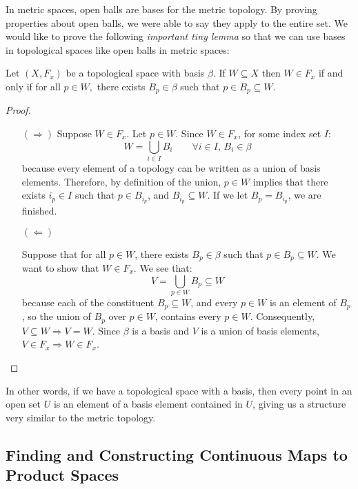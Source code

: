 In metric spaces, open balls are bases for the metric topology. By proving properties about open balls, we were able to say they apply to the entire set. We would like to prove the following \emph{important tiny lemma} so that we can use bases in topological spaces like open balls in metric spaces: 
\begin{lemma}
	Let $(X,F_x)$ be a topological space with basis $\beta$. If $W\subseteq X$ then $W\in F_x$ if and only if for all $p\in W,$ there exists $B_p\in\beta$ such that $p\in B_p\subseteq W$. 
\end{lemma}
\begin{proof}
	\begin{itemize}
		\item[$(\Rightarrow)$] Suppose $W\in F_x$. Let $p\in W$. Since $W\in F_x$, for some index set $I$:
		\[W = \bigcup_{i\in I}B_i \qquad \forall i\in I,\,B_i\in \beta\]
		because every element of a topology can be written as a union of basis elements. Therefore, by definition of the union, $p\in W$ implies that there exists $i_p\in I$ such that $p\in B_{i_p}$, and $B_{i_p}\subseteq W$. If we let $B_p = B_{i_p}$, we are finished.
		
		\item[$(\Leftarrow)$]
		
		Suppose that for all $p\in W$, there exists $B_p\in \beta$ such that $p\in B_p\subseteq W$. We want to show that $W\in F_x$. We see that:
		\[V = \bigcup_{p\in W}B_p\subseteq W\]
		because each of the constituent $B_p\subseteq W$, and every $p\in W$ is an element of $B_p$, so the union of $B_p$ over $p\in W$, contains every $p\in W$. Consequently, $V\subseteq W \Rightarrow V=W$. Since $\beta$ is a basis and $V$ is a union of basis elements, $V\in F_x \Rightarrow W\in F_x$. 
	\end{itemize}
\end{proof}

In other words, if we have a topological space with a basis, then every point in an open set $U$ is an element of a basis element contained in $U$, giving us a structure very similar to the metric topology.

\subsection{Finding and Constructing Continuous Maps to Product Spaces}

